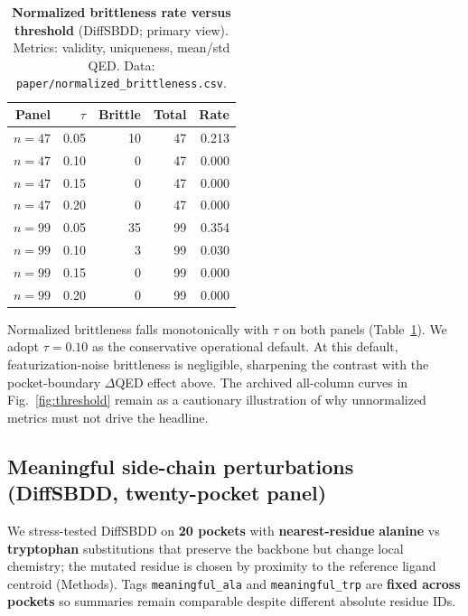 \documentclass[11pt]{article}
\begin{document}
\begin{table}[H]
  \centering
  \caption{\textbf{Normalized brittleness rate versus threshold} (DiffSBDD; primary view). Metrics: validity, uniqueness, mean/std QED. Data: \texttt{paper/normalized\_brittleness.csv}.}
  \label{tab:brittle}
  \begin{tabular}{@{}rrrrr@{}}
    \toprule
    Panel & $\tau$ & Brittle & Total & Rate \\
    \midrule
    $n=47$ & 0.05 & 10 & 47 & 0.213 \\
    $n=47$ & 0.10 & 0 & 47 & 0.000 \\
    $n=47$ & 0.15 & 0 & 47 & 0.000 \\
    $n=47$ & 0.20 & 0 & 47 & 0.000 \\
    $n=99$ & 0.05 & 35 & 99 & 0.354 \\
    $n=99$ & 0.10 & 3 & 99 & 0.030 \\
    $n=99$ & 0.15 & 0 & 99 & 0.000 \\
    $n=99$ & 0.20 & 0 & 99 & 0.000 \\
    \bottomrule
  \end{tabular}
\end{table}

Normalized brittleness falls monotonically with $\tau$ on both panels (Table~\ref{tab:brittle}). We adopt $\tau=0.10$ as the conservative operational default. At this default, featurization-noise brittleness is negligible, sharpening the contrast with the pocket-boundary $\Delta$QED effect above. The archived all-column curves in Fig.~\ref{fig:threshold} remain as a cautionary illustration of why unnormalized metrics must not drive the headline.

\subsection{Meaningful side-chain perturbations (DiffSBDD, twenty-pocket panel)}

We stress-tested DiffSBDD on \textbf{20 pockets} with \textbf{nearest-residue} \textbf{alanine} vs \textbf{tryptophan} substitutions that preserve the backbone but change local chemistry; the mutated residue is chosen by proximity to the reference ligand centroid (Methods). Tags \texttt{meaningful\_ala} and \texttt{meaningful\_trp} are \textbf{fixed across pockets} so summaries remain comparable despite different absolute residue IDs.
\end{document}
